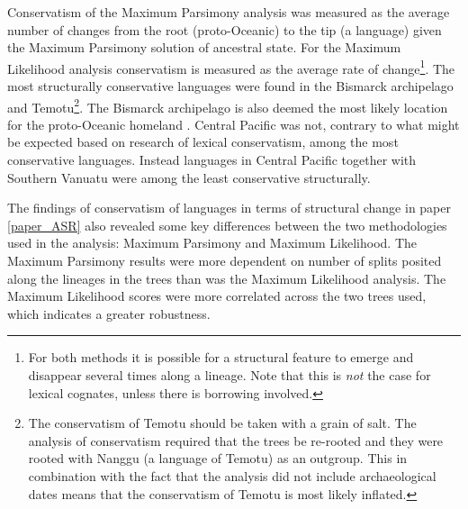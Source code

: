 \documentclass[a4paper,10pt]{article} %
\begin{document}
Conservatism of the Maximum Parsimony analysis was measured as the average number of changes from the root (proto-Oceanic) to the tip (a language) given the Maximum Parsimony solution of ancestral state. For the Maximum Likelihood analysis conservatism is measured as the average rate of change\footnote{For both methods it is possible for a structural feature to emerge and disappear several times along a lineage. Note that this is \emph{not} the case for lexical cognates, unless there is borrowing involved.}. The most structurally conservative languages were found in the Bismarck archipelago and Temotu\footnote{The conservatism of Temotu should be taken with a grain of salt. The analysis of conservatism required that the trees be re-rooted and they were rooted with Nanggu (a language of Temotu) as an outgroup. This in combination with the fact that the analysis did not include archaeological dates means that the conservatism of Temotu is most likely inflated.}. The Bismarck archipelago is also deemed the most likely location for the proto-Oceanic homeland \citep[97]{lynchrosscrowleyinternalsubgroupingoceanic}. Central Pacific was not, contrary to what might be expected based on research of lexical conservatism, among the most conservative languages. Instead languages in Central Pacific together with Southern Vanuatu were among the least conservative structurally.

The findings of conservatism of languages in terms of structural change in paper \ref{paper_ASR} also revealed some key differences between the two methodologies used in the analysis: Maximum Parsimony and Maximum Likelihood. The Maximum Parsimony results were more dependent on number of splits posited along the lineages in the trees than was the Maximum Likelihood analysis. The Maximum Likelihood scores were more correlated across the two trees used, which indicates a greater robustness.
\end{document}
